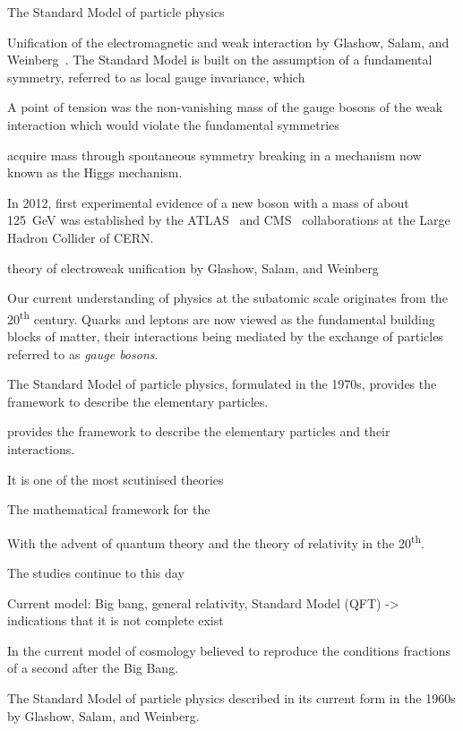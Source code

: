 The Standard Model of particle physics

Unification of the electromagnetic and weak interaction by Glashow, Salam, and
Weinberg~\cite{Glashow:1961tr,Salam:1964ry,Weinberg:1967tq}. The Standard Model
is built on the assumption of a fundamental symmetry, referred to as local gauge
invariance, which

A point of tension was the non-vanishing mass of the gauge bosons of the weak
interaction which would violate the fundamental symmetries

acquire mass through spontaneous symmetry breaking in a mechanism now known as
the Higgs mechanism.




In 2012, first experimental evidence of a new boson with a mass of about
\SI{125}{\GeV} was established by the ATLAS~\cite{HIGG-2012-27} and
CMS~\cite{CMS-HIG-12-028} collaborations at the Large Hadron Collider of CERN.

theory of electroweak unification by Glashow, Salam, and Weinberg



Our current understanding of physics at the subatomic scale originates from the
20\textsuperscript{th} century. Quarks and leptons are now viewed as the
fundamental building blocks of matter, their interactions being mediated by the
exchange of particles referred to as \emph{gauge bosons}.

The Standard Model of particle physics, formulated in the 1970s, provides the
framework to describe the elementary particles.

provides the framework to describe the
elementary particles and their interactions.

It is one of the most scutinised theories

The mathematical framework for the


With the advent of quantum theory and the theory of relativity in the
20\textsuperscript{th}.



The studies continue to this day

Current model: Big bang, general relativity, Standard Model (QFT)
-> indications that it is not complete exist

In the current model of cosmology believed to reproduce the conditions fractions
of a second after the Big Bang.


The Standard Model of particle physics described in its current form in the
1960s by Glashow, Salam, and Weinberg.

